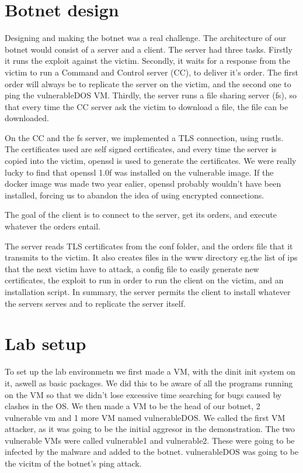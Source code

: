 \documentclass[../main.tex]{subfiles}
\begin{document}
    \vspace{10pt}

    \section{Botnet design}

    Designing and making the botnet was a real challenge. 
    The architecture of our botnet would consist of a server and a client. The server had three tasks. 
    Firstly it runs the exploit against the victim.
    Secondly, it waits for a response from the victim to run a Command and Control server (CC), to deliver it's order.
    The first order will always be to replicate the server on the victim, and the second one to ping the vulnerableDOS VM.
    Thirdly, the server runs a file sharing server (fs), so that every time the CC server ask the victim to download a file, the file can be downloaded.

    On the CC and the fs server, we implemented a TLS connection, using rustls. 
    The certificates used are self signed certificates, and every time the server is copied into the victim, openssl is used to generate the certificates.
    We were really lucky to find that openssl 1.0f was installed on the vulnerable image. 
    If the docker image was made two year ealier, openssl probably wouldn't have been installed, forcing us to abandon the idea of using encrypted connections.

    The goal of the client is to connect to the server, get its orders, and execute whatever the orders entail.

    The server reads TLS certificates from the conf folder, and the orders file that it transmits to the victim.
    It also creates files in the www directory eg.the list of ips that the next victim have to attack, a config file to easily generate new certificates, the exploit to run in order to run the client on the victim, and an installation script. In summary, the server permits the client to install whatever the servers serves and to replicate the server itself.

    \vspace{10pt}

    \section{Lab setup}

    To set up the lab environmetn we first made a VM, with the dinit init system on it, aswell as basic packages.
    We did this to be aware of all the programs running on the VM so that we didn't lose excessive time searching for bugs caused by clashes in the OS.
    We then made a VM to be the head of our botnet, 2 vulnerable vm and 1 more VM named vulnerableDOS.
    We called the first VM attacker, as it was going to be the initial aggresor in the demonstration.
    The two vulnerable VMs were called vulnerable1 and vulnerable2.
    These were going to be infected by the malware and added to the botnet.
    vulnerableDOS was going to be the vicitm of the botnet's ping attack.
\end{document}
